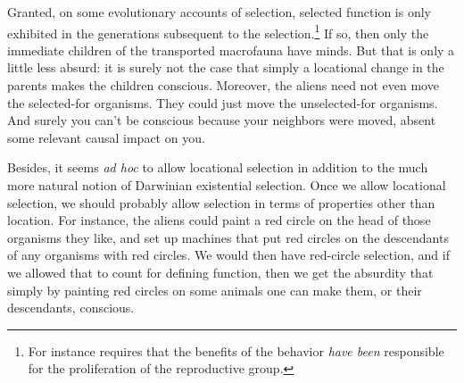 Granted, on some evolutionary accounts of selection, selected function is only exhibited in 
the generations subsequent to the selection.\footnote{For instance 
requires that the benefits of the behavior \textit{have been} responsible for the proliferation of the
reproductive group.}  If so, then only the immediate children of the transported macrofauna have minds.
But that is only a little less absurd: it is surely not the case that simply a locational change in the parents
makes the children conscious. Moreover, the aliens need not even move the selected-for organisms. They could just
move the unselected-for organisms. And surely you can't be conscious because your neighbors were
moved, absent some relevant causal impact on you.

Besides, it seems \textit{ad hoc} to allow locational selection in addition to the much more natural notion of 
Darwinian existential selection. Once we allow locational selection, we should probably allow selection in terms 
of properties other than location. For instance, the aliens could paint a red circle on the head of those organisms
they like, and set up machines that put red circles on the descendants of any organisms with red circles. We would
then have red-circle selection, and if we allowed that to count for defining function, then we get the absurdity
that simply by painting red circles on some animals one can make them, or their descendants, conscious. 

